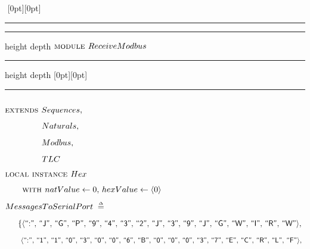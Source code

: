 \documentclass{article}
\makeatletter
\newcommand{\defeq}{\;\mathrel{\smash   %
    {{\stackrel{\scriptscriptstyle\Delta}{=}}}}\;}
\newcommand{\EXTENDS}{\textsc{extends }}
\newcommand{\INSTANCE}{\textsc{instance }}
\newcommand{\LOCAL}{\textsc{local }}
\newcommand{\MODULE}{\textsc{module }}
\newcommand{\WITH}{\textsc{ with }}
\renewcommand{\_}{\rule{.4em}{.06em}\hspace{.05em}}
\newlength{\charwidth}\settowidth{\charwidth}{{\small\tt M}}
\newlength{\boxrulewd}\setlength{\boxrulewd}{.4pt}
\newlength{\boxlineht}\setlength{\boxlineht}{.5\baselineskip}
\newcommand{\boxsep}{\charwidth}
\newlength{\boxruleht}\setlength{\boxruleht}{.5ex}
\newlength{\boxruledp}\setlength{\boxruledp}{-\boxruleht}
\newcommand{\boxrule}{\leaders\hrule height \boxruleht depth \boxruledp
                      \hfill\mbox{}}
\newcommand{\moduleLeftDash}%
   {\hspace*{-\boxsep}%
     \raisebox{-\boxlineht}[0pt][0pt]{\rule[.5ex]{\boxrulewd
               }{\boxlineht}}%
    \boxrule\hspace*{.4em }}
\newcommand{\moduleRightDash}%
    {\hspace*{.4em}\boxrule
    \raisebox{-\boxlineht}[0pt][0pt]{\rule[.5ex]{\boxrulewd
               }{\boxlineht}}\hspace{-\boxsep}}%
\newif\ifpcalshading \pcalshadingfalse
\newlength{\pcalvspace}\setlength{\pcalvspace}{0pt}%
\newcommand{\@pvspace}[1]{%
  \ifpcalshading
     \par\global\setlength{\pcalvspace}{#1}%
  \else
     \par\vspace{#1}%
  \fi
}
\renewcommand{\.}[1]{\ensuremath{\mbox{}#1\mbox{}}}
\newcommand{\@s}[1]{\hspace{#1pt}}
\newlength{\@xlen}
\newcommand\xtstrut%
  {\setlength{\@xlen}{1.05em}%
   \addtolength{\@xlen}{\pcalvspace}%
    \raisebox{\vshadelen}{\raisebox{-.25em}{\rule{0pt}{\@xlen}}}%
   \global\setlength{\vshadelen}{0pt}%
   \global\setlength{\pcalvspace}{0pt}}
\newcommand{\@x}[1]{\par
  \ifpcalshading
  \makebox[0pt][l]{\shadebox{\xtstrut\hspace*{\textwidth}}}%
  \fi
  \mbox{$\mbox{}#1\mbox{}$}}
\newcommand{\@xx}[1]{\mbox{$\mbox{}#1\mbox{}$}}
\newcommand{\@w}[1]{\textsf{``{#1}''}}
\def\graymargin{1}
\newlength{\templena}
\newlength{\templenb}
\newcommand{\shadebox}[1]{{\setlength{\fboxsep}{\graymargin pt}%
     \savebox{\tempboxa}{#1}%
     \settoheight{\templena}{\usebox{\tempboxa}}%
     \settodepth{\templenb}{\usebox{\tempboxa}}%
     \hspace*{-\fboxsep}\raisebox{0pt}[\templena][\templenb]%
        {\colorbox{boxshade}{\usebox{\tempboxa}}}\hspace*{-\fboxsep}}}
\newlength{\vshadelen}
\makeatother
\begin{document}
\tlatex
{}
\@x{}\moduleLeftDash\@xx{ {\MODULE} ReceiveModbus}\moduleRightDash\@xx{}%
\@pvspace{8.0pt}%
\@x{ {\EXTENDS} Sequences ,\,}%
\@x{\@s{43.93} Naturals ,\,}%
\@x{\@s{43.93} Modbus ,\,}%
\@x{\@s{43.93} TLC}%
\@pvspace{8.0pt}%
\@x{ {\LOCAL} {\INSTANCE} Hex}%
 \@x{\@s{16.4} {\WITH} natValue \.{\leftarrow} 0 ,\, hexValue \.{\leftarrow}
 {\langle} 0 {\rangle}}%
\@pvspace{8.0pt}%
\@x{ MessagesToSerialPort \.{\defeq}}%
 \@x{\@s{16.4} \{ {\langle}\@w{:} ,\,\@w{J} ,\,\@w{G} ,\,\@w{P} ,\,\@w{9}
 ,\,\@w{4} ,\,\@w{3} ,\,\@w{2} ,\,\@w{J} ,\,\@w{3} ,\,\@w{9} ,\,\@w{J}
 ,\,\@w{G} ,\,\@w{W} ,\,\@w{I} ,\,\@w{R} ,\,\@w{W} {\rangle} ,\,}%
 \@x{\@s{21.40} {\langle}\@w{:} ,\,\@w{1} ,\,\@w{1} ,\,\@w{0} ,\,\@w{3}
 ,\,\@w{0} ,\,\@w{0} ,\,\@w{6} ,\,\@w{B} ,\,\@w{0} ,\,\@w{0} ,\,\@w{0}
 ,\,\@w{3} ,\,\@w{7} ,\,\@w{E} ,\,\@w{C} ,\,\@w{R} ,\,\@w{L} ,\,\@w{F}
 {\rangle} ,\,}%
\end{document}
